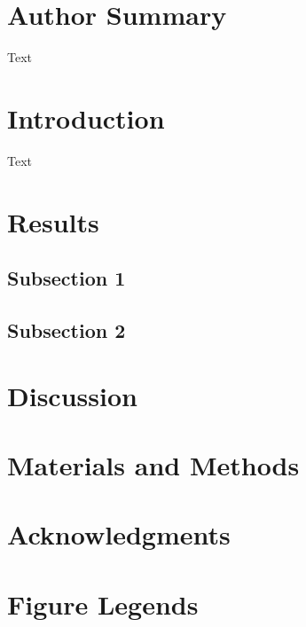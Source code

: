 \documentclass[10pt]{article}
\begin{document}
\section*{Author Summary}
Text

\section*{Introduction}
Text


\section*{Results}

\subsection*{Subsection 1}

\subsection*{Subsection 2}

\section*{Discussion}
\cite{Mizuseki 2012}


\section*{Materials and Methods}

\section*{Acknowledgments}




\section*{Figure Legends}
\end{document}
